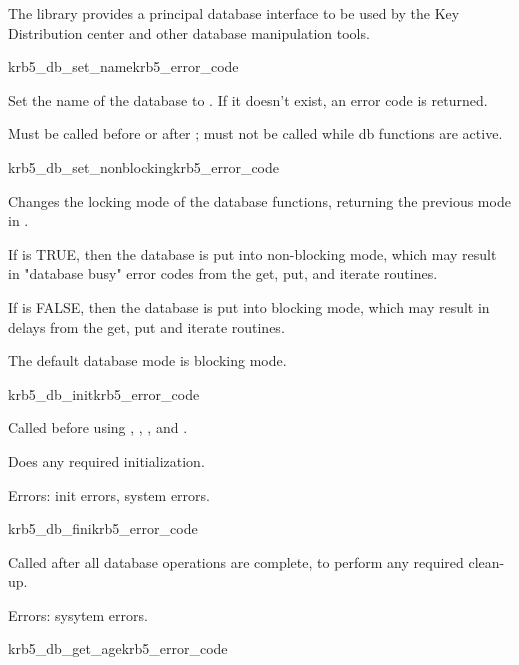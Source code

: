 The  library provides a principal database interface
to be used by the Key Distribution center and other database
manipulation tools.


\begin{funcdecl}{krb5_db_set_name}{krb5_error_code}{\funcin}
\end{funcdecl}

Set the name of the database to .  If it doesn't exist,
an error code is returned.

Must be called before  or after
; must not be called while db functions are active.

\begin{funcdecl}{krb5_db_set_nonblocking}{krb5_error_code}{\funcin}
\funcout
{}
\end{funcdecl}

Changes the locking mode of the database functions, returning the previous
mode in .

If  is TRUE, then the database is put into
non-blocking mode, which may result in "database busy" error codes from
the get, put, and iterate routines.

If  is FALSE, then the database is put into blocking mode,
which may result in delays from the get, put and iterate routines.

The default database mode is blocking mode.

\begin{funcdecl}{krb5_db_init}{krb5_error_code}{\funcvoid}
\end{funcdecl}

Called before using ,
, , and
.

Does any required initialization.

Errors: init errors, system errors.

\begin{funcdecl}{krb5_db_fini}{krb5_error_code}{\funcvoid}
\end{funcdecl}

Called after all database operations are complete, to perform any required
clean-up.

Errors: sysytem errors.


\begin{funcdecl}{krb5_db_get_age}{krb5_error_code}{\funcin}
\funcout
{}
\end{funcdecl}

